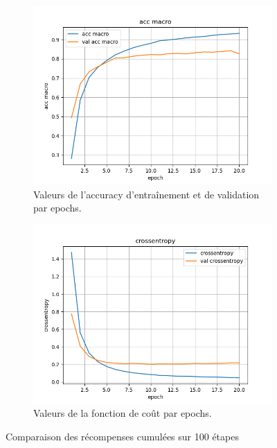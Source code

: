 \documentclass[a4paper]{article}
\begin{document}
\begin{figure}[H]
    \centering
    \begin{subfigure}{0.45\textwidth}
        \centering
        \includegraphics[width=\linewidth]{../logs/get_pos_French/acc macro.png}
        \caption{Valeurs de l'accuracy d'entraînement et de validation par epochs.}
    \end{subfigure}
    \hfill
    \begin{subfigure}{0.45\textwidth}
        \centering
        \includegraphics[width=\linewidth]{../logs/get_pos_French/crossentropy.png}
        \caption{Valeurs de la fonction de coût par epochs.}
    \end{subfigure}
    \caption{Comparaison des récompenses cumulées sur 100 étapes}
\end{figure}
\end{document}
